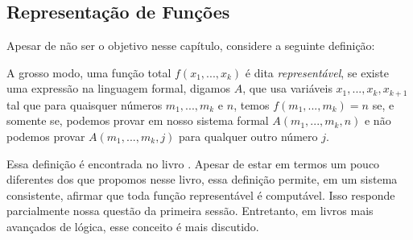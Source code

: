 \subsection{Representação de Funções}

Apesar de não ser o objetivo nesse capítulo, considere a seguinte definição: 

\begin{definition}
    \label{represent}
    A grosso modo, uma função total $f(x_1, ..., x_k)$ é dita
    \textit{representável}, se existe uma expressão na linguagem formal,
    digamos $A$, que usa variáveis $x_1, ..., x_k, x_{k+1}$ tal que para
    quaisquer números $m_1,...,m_k$ e $n$, temos $f(m_1,...,m_k) = n$ se, e
    somente se, podemos provar em nosso sistema formal $A(m_1,...,m_k,n)$ e
    não podemos provar $A(m_1,...,m_k,j)$ para qualquer outro número $j$.
\end{definition}

Essa definição é encontrada no livro \cite{functionsComputaveis}. Apesar de
estar em termos um pouco diferentes dos que propomos nesse livro, essa
definição permite, em um sistema consistente, afirmar que toda função
representável é computável. Isso responde parcialmente nossa questão da
primeira sessão. Entretanto, em livros mais avançados de lógica, esse conceito
é mais discutido. 